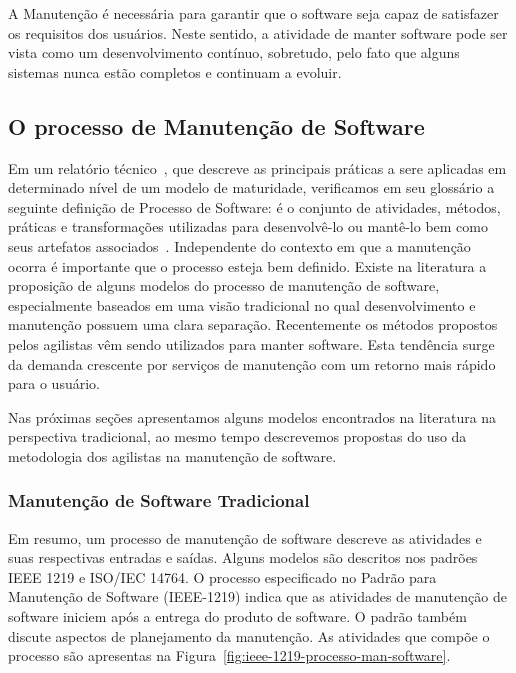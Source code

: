 A Manutenção é necessária para garantir que o software seja capaz de satisfazer
os requisitos dos usuários. Neste sentido, a atividade de manter software pode
ser vista como um desenvolvimento contínuo, sobretudo, pelo fato que alguns
sistemas nunca estão completos e continuam a evoluir.


\subsection{O processo de Manutenção de Software}
\label{sec:o_processo_de_manutecao_de_software}

Em um relatório técnico~\cite{paulk1993key}, que descreve as principais práticas
a sere aplicadas em determinado nível de um modelo de maturidade, verificamos em
seu glossário a seguinte definição de Processo de Software: é o conjunto de
atividades, métodos, práticas e transformações utilizadas para desenvolvê-lo ou
mantê-lo bem como seus artefatos associados~\cite{paulk1993key}. Independente do
contexto em que a manutenção ocorra é importante que o processo esteja bem
definido. Existe na literatura a proposição de alguns modelos do processo de
manutenção de software, especialmente baseados em uma visão tradicional no qual
desenvolvimento e manutenção possuem uma clara separação. Recentemente os
métodos propostos pelos agilistas vêm sendo utilizados para manter software.
Esta tendência surge da demanda crescente por serviços de manutenção com um
retorno mais rápido para o usuário.
\todoend

Nas próximas seções apresentamos alguns modelos encontrados na literatura na
perspectiva tradicional, ao mesmo tempo descrevemos propostas do uso da
metodologia dos agilistas na manutenção de software.

\subsubsection{Manutenção de Software Tradicional}
\label{subsec:manutenção_de_software_tradicional}

Em resumo, um processo de manutenção de software descreve as atividades e suas
respectivas entradas e saídas. Alguns modelos são descritos nos padrões IEEE
1219 e ISO/IEC 14764. O processo especificado no Padrão para Manutenção de
Software (IEEE\@-\@1219) indica que as atividades de manutenção de software
iniciem após a entrega do produto de software. O padrão também discute aspectos
de planejamento da manutenção. As atividades que compõe o processo são
apresentas na Figura~\ref{fig:ieee-1219-processo-man-software}.

